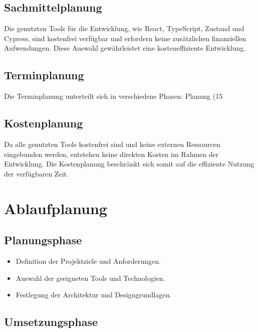 \documentclass[hidelinks,12pt]{article}
\begin{document}
\subsection{Sachmittelplanung}
Die genutzten Tools für die Entwicklung, wie React, TypeScript, Zustand und Cypress, sind kostenfrei verfügbar und erfordern keine zusätzlichen finanziellen Aufwendungen. Diese Auswahl gewährleistet eine kosteneffiziente Entwicklung.

\subsection{Terminplanung}
Die Terminplanung unterteilt sich in verschiedene Phasen: Planung (15%

\subsection{Kostenplanung}
Da alle genutzten Tools kostenfrei sind und keine externen Ressourcen eingebunden werden, entstehen keine direkten Kosten im Rahmen der Entwicklung. Die Kostenplanung beschränkt sich somit auf die effiziente Nutzung der verfügbaren Zeit.

\section{Ablaufplanung}

\subsection{Planungsphase}

\begin{itemize}
    \item Definition der Projektziele und Anforderungen.
    \item Auswahl der geeigneten Tools und Technologien.
    \item Festlegung der Architektur und Designgrundlagen.
\end{itemize}

\subsection{Umsetzungsphase}
\end{document}
